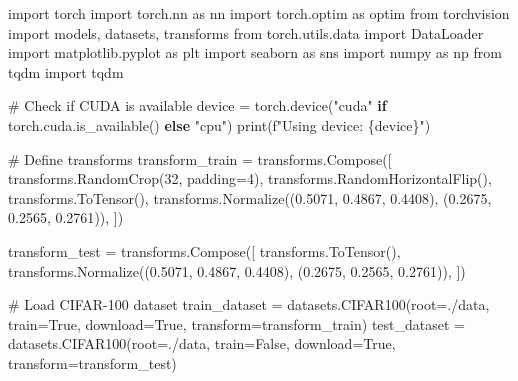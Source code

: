 \documentclass[
  letterpaper,
  DIV=11,
  numbers=noendperiod]{scrreprt}
\newenvironment{Shaded}{\begin{snugshade}}{\end{snugshade}}
\newcommand{\BuiltInTok}[1]{\textcolor[rgb]{0.00,0.23,0.31}{#1}}
\newcommand{\CommentTok}[1]{\textcolor[rgb]{0.37,0.37,0.37}{#1}}
\newcommand{\ControlFlowTok}[1]{\textcolor[rgb]{0.00,0.23,0.31}{\textbf{#1}}}
\newcommand{\DecValTok}[1]{\textcolor[rgb]{0.68,0.00,0.00}{#1}}
\newcommand{\FloatTok}[1]{\textcolor[rgb]{0.68,0.00,0.00}{#1}}
\newcommand{\ImportTok}[1]{\textcolor[rgb]{0.00,0.46,0.62}{#1}}
\newcommand{\NormalTok}[1]{\textcolor[rgb]{0.00,0.23,0.31}{#1}}
\newcommand{\OperatorTok}[1]{\textcolor[rgb]{0.37,0.37,0.37}{#1}}
\newcommand{\SpecialCharTok}[1]{\textcolor[rgb]{0.37,0.37,0.37}{#1}}
\newcommand{\SpecialStringTok}[1]{\textcolor[rgb]{0.13,0.47,0.30}{#1}}
\newcommand{\StringTok}[1]{\textcolor[rgb]{0.13,0.47,0.30}{#1}}
\newcommand{\VariableTok}[1]{\textcolor[rgb]{0.07,0.07,0.07}{#1}}
\begin{document}
\begin{Shaded}
\begin{Highlighting}[]
\ImportTok{import}\NormalTok{ torch}
\ImportTok{import}\NormalTok{ torch.nn }\ImportTok{as}\NormalTok{ nn}
\ImportTok{import}\NormalTok{ torch.optim }\ImportTok{as}\NormalTok{ optim}
\ImportTok{from}\NormalTok{ torchvision }\ImportTok{import}\NormalTok{ models, datasets, transforms}
\ImportTok{from}\NormalTok{ torch.utils.data }\ImportTok{import}\NormalTok{ DataLoader}
\ImportTok{import}\NormalTok{ matplotlib.pyplot }\ImportTok{as}\NormalTok{ plt}
\ImportTok{import}\NormalTok{ seaborn }\ImportTok{as}\NormalTok{ sns}
\ImportTok{import}\NormalTok{ numpy }\ImportTok{as}\NormalTok{ np}
\ImportTok{from}\NormalTok{ tqdm }\ImportTok{import}\NormalTok{ tqdm}

\CommentTok{\# Check if CUDA is available}
\NormalTok{device }\OperatorTok{=}\NormalTok{ torch.device(}\StringTok{"cuda"} \ControlFlowTok{if}\NormalTok{ torch.cuda.is\_available() }\ControlFlowTok{else} \StringTok{"cpu"}\NormalTok{)}
\BuiltInTok{print}\NormalTok{(}\SpecialStringTok{f"Using device: }\SpecialCharTok{\{}\NormalTok{device}\SpecialCharTok{\}}\SpecialStringTok{"}\NormalTok{)}

\CommentTok{\# Define transforms}
\NormalTok{transform\_train }\OperatorTok{=}\NormalTok{ transforms.Compose([}
\NormalTok{    transforms.RandomCrop(}\DecValTok{32}\NormalTok{, padding}\OperatorTok{=}\DecValTok{4}\NormalTok{),}
\NormalTok{    transforms.RandomHorizontalFlip(),}
\NormalTok{    transforms.ToTensor(),}
\NormalTok{    transforms.Normalize((}\FloatTok{0.5071}\NormalTok{, }\FloatTok{0.4867}\NormalTok{, }\FloatTok{0.4408}\NormalTok{), (}\FloatTok{0.2675}\NormalTok{, }\FloatTok{0.2565}\NormalTok{, }\FloatTok{0.2761}\NormalTok{)),}
\NormalTok{])}

\NormalTok{transform\_test }\OperatorTok{=}\NormalTok{ transforms.Compose([}
\NormalTok{    transforms.ToTensor(),}
\NormalTok{    transforms.Normalize((}\FloatTok{0.5071}\NormalTok{, }\FloatTok{0.4867}\NormalTok{, }\FloatTok{0.4408}\NormalTok{), (}\FloatTok{0.2675}\NormalTok{, }\FloatTok{0.2565}\NormalTok{, }\FloatTok{0.2761}\NormalTok{)),}
\NormalTok{])}

\CommentTok{\# Load CIFAR{-}100 dataset}
\NormalTok{train\_dataset }\OperatorTok{=}\NormalTok{ datasets.CIFAR100(root}\OperatorTok{=}\StringTok{\textquotesingle{}./data\textquotesingle{}}\NormalTok{, train}\OperatorTok{=}\VariableTok{True}\NormalTok{, download}\OperatorTok{=}\VariableTok{True}\NormalTok{, transform}\OperatorTok{=}\NormalTok{transform\_train)}
\NormalTok{test\_dataset }\OperatorTok{=}\NormalTok{ datasets.CIFAR100(root}\OperatorTok{=}\StringTok{\textquotesingle{}./data\textquotesingle{}}\NormalTok{, train}\OperatorTok{=}\VariableTok{False}\NormalTok{, download}\OperatorTok{=}\VariableTok{True}\NormalTok{, transform}\OperatorTok{=}\NormalTok{transform\_test)}


\end{Highlighting}
\end{Shaded}
\end{document}
